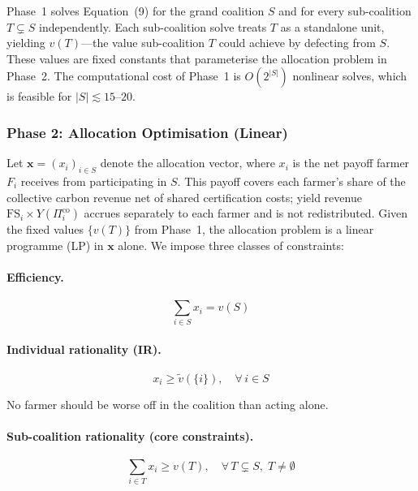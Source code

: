 \documentclass[manuscript, screen, review, anonymous]{acmart}
\begin{document}
Phase~1 solves Equation~(9) for the grand coalition $S$ and for every
sub-coalition $T \subsetneq S$ independently. Each sub-coalition solve treats
$T$ as a standalone unit, yielding $v(T)$---the value sub-coalition $T$ could
achieve by defecting from $S$. These values are fixed constants that parameterise
the allocation problem in Phase~2. The computational cost of Phase~1 is
$O(2^{|S|})$ nonlinear solves, which is feasible for $|S| \lesssim 15$--$20$.

\subsubsection*{Phase 2: Allocation Optimisation (Linear)}

Let $\mathbf{x} = (x_i)_{i \in S}$ denote the allocation vector, where $x_i$
is the net payoff farmer $F_i$ receives from participating in $S$. This payoff
covers each farmer's share of the collective carbon revenue net of shared
certification costs; yield revenue $\text{FS}_i \times Y(\Pi_i^{\text{co}})$
accrues separately to each farmer and is not redistributed. Given the fixed
values $\{v(T)\}$ from Phase~1, the allocation problem is a linear programme
(LP) in $\mathbf{x}$ alone. We impose three classes of constraints:

\paragraph{Efficiency.}
\begin{equation}
    \sum_{i \in S} x_i = v(S)
\end{equation}

\paragraph{Individual rationality (IR).}
\begin{equation}
    x_i \geq \tilde{v}\!\left(\{i\}\right), \quad \forall\, i \in S
\end{equation}

No farmer should be worse off in the coalition than acting alone.

\paragraph{Sub-coalition rationality (core constraints).}
\begin{equation}
    \sum_{i \in T} x_i \geq v(T), \quad \forall\, T \subsetneq S,\; T \neq \emptyset
\end{equation}
\end{document}
